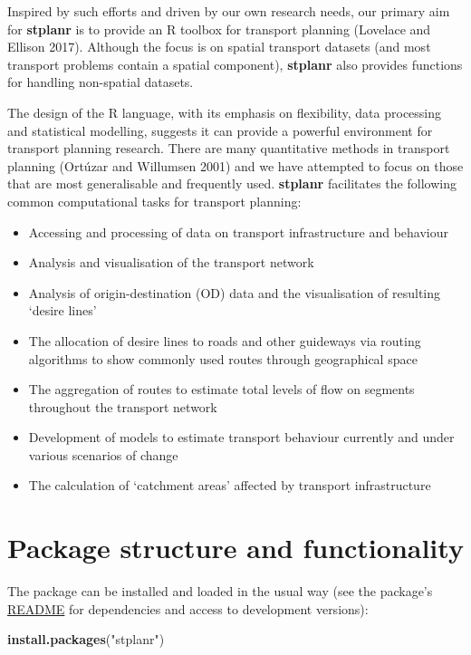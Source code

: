 \documentclass[11pt]{article}
\providecommand{\tightlist}{%
  \setlength{\itemsep}{0pt}\setlength{\parskip}{0pt}}
\newenvironment{Shaded}{\begin{snugshade}}{\end{snugshade}}
\newcommand{\KeywordTok}[1]{\textcolor[rgb]{0.13,0.29,0.53}{\textbf{{#1}}}}
\newcommand{\StringTok}[1]{\textcolor[rgb]{0.31,0.60,0.02}{{#1}}}
\newcommand{\NormalTok}[1]{{#1}}
\begin{document}
Inspired by such efforts and driven by our own research needs, our
primary aim for \textbf{stplanr} is to provide an R toolbox for
transport planning (Lovelace and Ellison 2017). Although the focus is on
spatial transport datasets (and most transport problems contain a
spatial component), \textbf{stplanr} also provides functions for
handling non-spatial datasets.

The design of the R language, with its emphasis on flexibility, data
processing and statistical modelling, suggests it can provide a powerful
environment for transport planning research. There are many quantitative
methods in transport planning (Ortúzar and Willumsen 2001) and we have
attempted to focus on those that are most generalisable and frequently
used. \textbf{stplanr} facilitates the following common computational
tasks for transport planning:

\begin{itemize}
\tightlist
\item
  Accessing and processing of data on transport infrastructure and
  behaviour
\item
  Analysis and visualisation of the transport network
\item
  Analysis of origin-destination (OD) data and the visualisation of
  resulting `desire lines'
\item
  The allocation of desire lines to roads and other guideways via
  routing algorithms to show commonly used routes through geographical
  space
\item
  The aggregation of routes to estimate total levels of flow on segments
  throughout the transport network
\item
  Development of models to estimate transport behaviour currently and
  under various scenarios of change
\item
  The calculation of `catchment areas' affected by transport
  infrastructure
\end{itemize}

\section{Package structure and
functionality}\label{package-structure-and-functionality}

The package can be installed and loaded in the usual way (see the
package's \href{https://github.com/ropensci/stplanr}{README} for
dependencies and access to development versions):

\begin{Shaded}
\begin{Highlighting}[]
\KeywordTok{install.packages}\NormalTok{(}\StringTok{"stplanr"}\NormalTok{)}
\end{Highlighting}
\end{Shaded}
\end{document}
